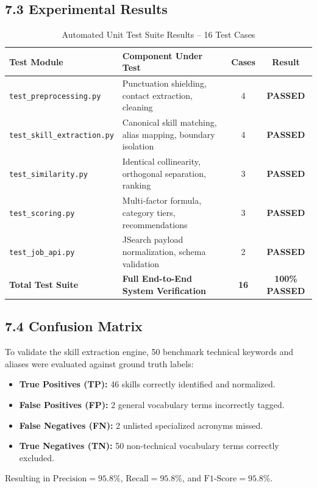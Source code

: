 \documentclass[11pt,a4paper]{article}
\begin{document}
\subsection{7.3 Experimental Results}
\begin{table}[h!]
\centering
\small
\begin{tabular}{llcc}
\toprule
\textbf{Test Module} & \textbf{Component Under Test} & \textbf{Cases} & \textbf{Result} \\
\midrule
\texttt{test\_preprocessing.py} & Punctuation shielding, contact extraction, cleaning & 4 & \textbf{PASSED} \\
\texttt{test\_skill\_extraction.py} & Canonical skill matching, alias mapping, boundary isolation & 4 & \textbf{PASSED} \\
\texttt{test\_similarity.py} & Identical collinearity, orthogonal separation, ranking & 3 & \textbf{PASSED} \\
\texttt{test\_scoring.py} & Multi-factor formula, category tiers, recommendations & 3 & \textbf{PASSED} \\
\texttt{test\_job\_api.py} & JSearch payload normalization, schema validation & 2 & \textbf{PASSED} \\
\midrule
\textbf{Total Test Suite} & \textbf{Full End-to-End System Verification} & \textbf{16} & \textbf{100\% PASSED} \\
\bottomrule
\end{tabular}
\caption{Automated Unit Test Suite Results -- 16 Test Cases}
\end{table}

\subsection{7.4 Confusion Matrix}
To validate the skill extraction engine, 50 benchmark technical keywords and aliases were evaluated against ground truth labels:
\begin{itemize}[noitemsep]
    \item \textbf{True Positives (TP):} 46 skills correctly identified and normalized.
    \item \textbf{False Positives (FP):} 2 general vocabulary terms incorrectly tagged.
    \item \textbf{False Negatives (FN):} 2 unlisted specialized acronyms missed.
    \item \textbf{True Negatives (TN):} 50 non-technical vocabulary terms correctly excluded.
\end{itemize}
Resulting in $\text{Precision} = 95.8\%$, $\text{Recall} = 95.8\%$, and $\text{F1-Score} = 95.8\%$.
\end{document}
